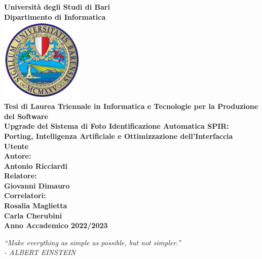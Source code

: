\documentclass[a4paper,12pt]{report}
\begin{document}

\begin{titlepage}
\centering

\textbf{\large Università degli Studi di Bari} \\
\vspace{0.3cm}
\textbf{\large Dipartimento di Informatica} \\
\vspace{1.5cm}
\includegraphics[width=40mm,scale=0.5]{assets/images/logo.png} \\
\vspace{1.5cm}
\textbf{\large Tesi di Laurea Triennale in Informatica e Tecnologie per la Produzione del Software} \\
\vspace{1cm}
\textbf{\LARGE Upgrade del Sistema di Foto Identificazione Automatica SPIR: Porting, Intelligenza Artificiale e Ottimizzazione dell'Interfaccia Utente} \\
\vspace{0.7cm}
\textbf{\large Autore:} \\
\textbf{Antonio Ricciardi} \\
\vspace{0.3cm}
\textbf{\large Relatore:} \\
\textbf{Giovanni Dimauro} \\
\vspace{0.3cm}
\textbf{\large Correlatori:} \\
\textbf{Rosalia Maglietta} \\
\textbf{Carla Cherubini} \\
\vfill
\vspace{0.3cm}
\textbf{\large Anno Accademico 2022/2023} %
    
\end{titlepage}
\clearpage
\thispagestyle{empty}

\vspace*{\fill}
\begin{center}
\textit{“Make everything as simple as possible, but not simpler.”\\
- ALBERT EINSTEIN}
\end{center}
\vfill
\clearpage
\tableofcontents
\end{document}
